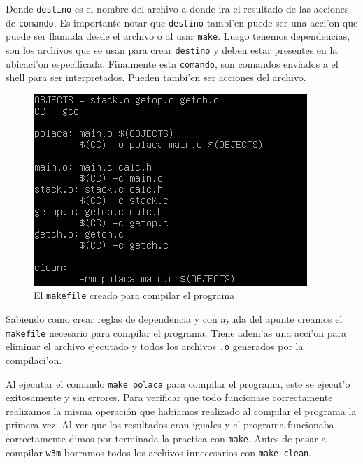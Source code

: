 \documentclass[11pt]{article}
\begin{document}
		Donde \texttt{\textcolor{light-blue}{destino}} es el nombre del archivo a donde ira el resultado de las acciones de \texttt{\textcolor{light-red}{comando}}. Es importante notar que \texttt{\textcolor{light-blue}{destino}} tambi'en puede ser una acci'on que puede ser llamada desde el archivo o al usar \texttt{make}. Luego tenemos dependencias, son los archivos que se usan para crear \texttt{\textcolor{orange-desert-vim}{destino}} y deben estar presentes en la ubicaci'on especificada. Finalmente esta \texttt{\textcolor{light-red}{comando}}, son comandos enviados a el shell para ser interpretados. Pueden tambi'en ser acciones del archivo.
		
		\begin{figure}[H]
			\centering
			\includegraphics[width=.9\linewidth]{Images/Seccion 2/S2 parte tres.PNG}
			\caption{El \texttt{makefile} creado para compilar el programa}
			\label{fig:makefile}
		\end{figure}
		
		Sabiendo como crear reglas de dependencia y con ayuda del apunte creamos el \texttt{makefile} necesario para compilar el programa. Tiene adem'as una acci'on para eliminar el archivo ejecutado y todos los archivos \texttt{.o} generados por la compilaci'on.
		
		Al ejecutar el comando \texttt{make polaca} para compilar el programa, este se ejecut'o exitosamente y sin errores. Para verificar que todo funcionase correctamente realizamos la misma operación que habíamos realizado al compilar el programa la primera vez. Al ver que los resultados eran iguales y el programa funcionaba correctamente dimos por terminada la practica con \texttt{make}. Antes de pasar a compilar \texttt{w3m} borramos todos los archivos innecesarios con \texttt{make clean}.
		
\end{document}
